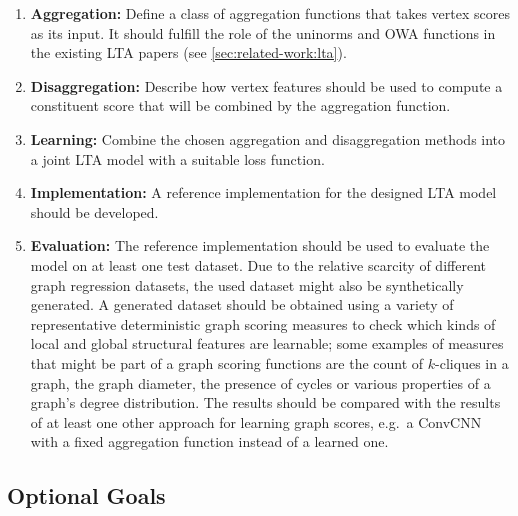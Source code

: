 \documentclass[12pt]{scrartcl}
\begin{document}
\begin{enumerate}[label=\textbf{\arabic*.}]
	\item \textbf{Aggregation:}
		Define a class of aggregation functions that takes vertex scores as its input.
		It should fulfill the role of the uninorms and OWA functions in the existing LTA papers (see \cref{sec:related-work:lta}).
	\item \textbf{Disaggregation:}
		Describe how vertex features should be used to compute a constituent score that will be combined by the aggregation function.
	\item \textbf{Learning:}
		Combine the chosen aggregation and disaggregation methods into a joint LTA model with a suitable loss function.
	\item \textbf{Implementation:}
		A reference implementation for the designed LTA model should be developed.
	\item \textbf{Evaluation:}
		The reference implementation should be used to evaluate the model on at least one test dataset.
		Due to the relative scarcity of different graph regression datasets, the used dataset might also be synthetically generated.
		A generated dataset should be obtained using a variety of representative deterministic graph scoring measures to check which kinds of local and global structural features are learnable;
		some examples of measures that might be part of a graph scoring functions are the count of $k$-cliques in a graph, the graph diameter, the presence of cycles or various properties of a graph's degree distribution.
		The results should be compared with the results of at least one other approach for learning graph scores, e.g.\ a ConvCNN with a fixed aggregation function instead of a learned one.
\end{enumerate}

\subsection{Optional Goals}%
\label{sec:goals:opt}
\end{document}
